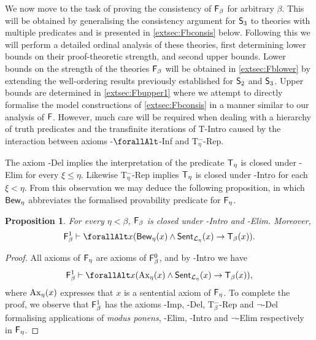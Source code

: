 \documentclass[UKenglish,cleveref,DIV=12]{scrartcl}
\let\forall\forallAlt
\newtheorem{proposition}[lemma]{Proposition}
\theoremstyle{definition}
\theoremstyle{definition}
\begin{document}
We now move to the task of proving the consistency of $\mathsf{F}_\beta$ for arbitrary
$\beta$. This will be obtained by generalising the consistency argument for
$\mathsf{S}_3$ to theories with multiple predicates and is presented in
\cref{extsec:Fbconsis} below. Following this we will perform a detailed ordinal
analysis of these theories, first determining lower bounds on their
proof-theoretic strength, and second upper bounds. Lower bounds on the strength
of the theories $\mathsf{F}_\beta$ will be obtained in \cref{extsec:Fblower} by
extending the well-ordering results previously established for $\mathsf{S}_2$ and
$\mathsf{S}_3$. Upper bounds are determined in \cref{extsec:Fbupper1} where we
attempt to directly formalise the model constructions of \cref{extsec:Fbconsis}
in a manner similar to our analysis of $\mathsf{F}$. However, much care will be required when
dealing with a hierarchy of truth predicates and the transfinite iterations of
T-Intro caused by the interaction between axioms \textT\eta-$\forall$-Inf and T$_\eta^-$-Rep.

The axiom \textT\eta-Del implies the interpretation of the predicate $\mathsf{T}_\eta$ is closed under \textT\xi-Elim for every $\xi\le\eta$. Likewise T$_\eta^-$-Rep implies $\mathsf{T}_\eta$ is closed under \textT\xi-Intro for each $\xi<\eta$. From this observation we may deduce the following proposition, in which $\mathsf{Bew}_\eta$ abbreviates the formalised provability predicate for $\mathsf{F}_\eta$.
\begin{proposition}\label{extprop:FFreflec}
 For every $\eta<\beta$, $\mathsf{F}_\beta$ is closed under \textT\eta-Intro and \textT\eta-Elim. Moreover, \[\F_\beta^1\proves \forall x( \Prov_{\eta}(x)\land\Sent_{\L_\eta}(x)\rightarrow \T_\beta(x)).\]
\end{proposition}
\begin{proof}
All axioms of $\mathsf{F}_\eta$ are axioms of $\mathsf{F}_\beta^0$, and by \textT\beta-Intro we have
\begin{align*}
  \F_\beta^1\proves \forall x( \set{Ax}_{\eta}(x)\land\Sent_{\L_\eta}(x)\rightarrow \T_\beta(x)),
\end{align*}
where $\mathrm{Ax}_\eta(x)$ expresses that $x$ is a sentential axiom of $\mathsf{F}_\eta$.
To complete the proof, we observe that $\mathsf{F}_\beta^1$ has the axioms
\textT\beta-Imp, \textT\beta-Del, T$_\beta^-$-Rep and $\lnot$\textT\beta-Del
formalising applications of {\em modus ponens}, \textT\eta-Elim, \textT\eta-Intro and $\lnot$\textT\eta-Elim respectively in $\mathsf{F}_\eta$.
\end{proof}
\end{document}
